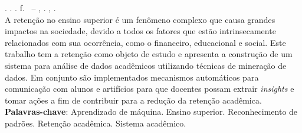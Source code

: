 
\begin{resumo}[RESUMO]
\begin{SingleSpacing}

\imprimirautorcitacao. \imprimirtitulo. \imprimirdata. \pageref {LastPage} f. \imprimirprojeto\ – \imprimirprograma, \imprimirinstituicao. \imprimirlocal, \imprimirdata.\\

A retenção no ensino superior é um fenômeno complexo que causa grandes impactos na sociedade, devido a todos os fatores que estão intrinsecamente relacionados com sua ocorrência, como o financeiro, educacional e social.
Este trabalho tem a retenção como objeto de estudo e apresenta a construção de um sistema para análise de dados acadêmicos utilizando técnicas de mineração de dados.
Em conjunto são implementados mecanismos automáticos para comunicação com alunos e artifícios para que docentes possam extrair \textit{insights} e tomar ações a fim de contribuir para a redução da retenção acadêmica.
\\

\textbf{Palavras-chave}:
Aprendizado de máquina. Ensino superior. Reconhecimento de padrões. Retenção acadêmica. Sistema acadêmico.

\end{SingleSpacing}
\end{resumo}

